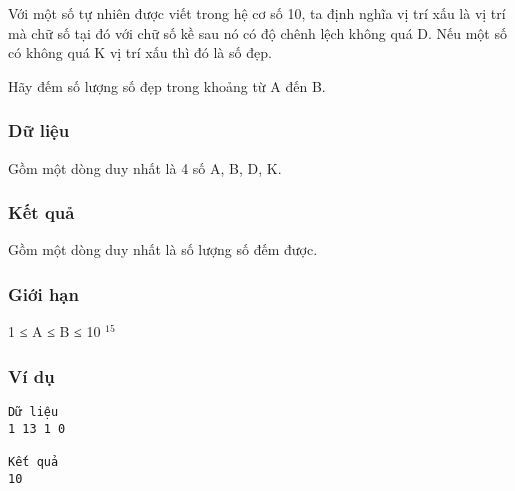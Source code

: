 



   Với một số tự nhiên được viết trong hệ cơ số 10, ta định nghĩa vị trí xấu là vị trí mà chữ số tại đó với chữ số kề sau nó có độ chênh lệch không quá D. Nếu một số có không quá K vị trí xấu thì đó là số đẹp.  

   Hãy đếm số lượng số đẹp trong khoảng từ A đến B.  

\subsubsection{   Dữ liệu  }

   Gồm một dòng duy nhất là 4 số A, B, D, K.  

\subsubsection{   Kết quả  }

   Gồm một dòng duy nhất là số lượng số đếm được.  

\subsubsection{   Giới hạn  }

   1 ≤ A ≤ B ≤ 10   $^    15   $

\subsubsection{   Ví dụ  }
\begin{verbatim}
Dữ liệu
1 13 1 0

Kết quả
10
\end{verbatim}